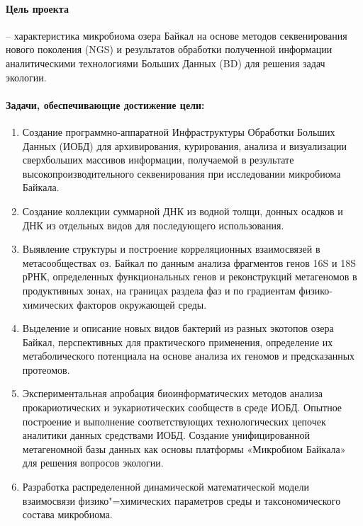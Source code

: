 \documentclass[a4paper,12pt,openany,final]{extreport}
\makeatletter
\def\vhrulefill#1{\leavevmode\leaders\hrule\@height#1\hfill \kern\z@}
\newcommand\toprule{\noindent\vhrulefill{2pt}}
\newcommand\bottomrule{\noindent\vhrulefill{2pt}}
\makeatother
\begin{document}
\paragraph{Цель проекта} \hspace{-1.5ex}-- характеристика микробиома озера Байкал на основе
методов секвенирования нового поколения (NGS) и результатов обработки
полученной информации аналитическими технологиями Больших Данных (BD)
для решения задач экологии.

\paragraph{Задачи, обеспечивающие достижение цели:}
\begin{enumerate}
\item Создание программно-аппаратной Инфраструктуры Обработки
  Больших Данных (ИОБД) для архивирования, курирования, анализа и
  визуализации сверхбольших массивов информации, получаемой в
  результате высокопроизводительного секвенирования при исследовании
  микробиома Байкала.

\item  Создание коллекции суммарной ДНК из водной толщи, донных осадков и
ДНК из отдельных видов для последующего использования.

\item  Выявление структуры и построение корреляционных взаимосвязей в
метасообществах оз. Байкал по данным анализа фрагментов генов 16S и 18S
рРНК, определенных функциональных генов и реконструкций метагеномов в
продуктивных зонах, на границах раздела фаз и по градиентам
физико-химических факторов окружающей среды.

\item  Выделение и описание новых видов бактерий из разных экотопов озера
Байкал, перспективных для практического применения, определение их
метаболического потенциала на основе анализа их геномов и предсказанных
протеомов.

\item  Экспериментальная апробация биоинформатических методов анализа
прокариотических и эукариотических сообществ в среде ИОБД. Опытное
построение и выполнение соответствующих технологических цепочек
аналитики данных средствами ИОБД. Создание унифицированной метагеномной
базы данных как основы платформы «Микробиом Байкала» для решения
вопросов экологии.

\item Разработка распределенной динамической математической модели взаимосвязи физико"=химических параметров среды и таксономического состава микробиома.\strut
\end{enumerate}
\clearpage{}
\end{document}
